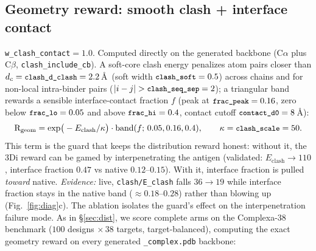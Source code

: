 \documentclass[11pt]{article}
\newcommand{\R}{\mathrm{R}}
\newcommand{\eclash}{E_{\mathrm{clash}}}
\newcommand{\ttk}[1]{\texttt{\small #1}}
\begin{document}
\subsection{Geometry reward: smooth clash + interface contact}
\ttk{w\_clash\_contact}$=1.0$. Computed directly on the generated backbone (C$\alpha$ plus
C$\beta$, \ttk{clash\_include\_cb}). A soft-core clash energy penalizes atom pairs closer than
$d_c=\ttk{clash\_d\_clash}=2.2$\,\AA\ (soft width $\ttk{clash\_soft}=0.5$) across chains and for
non-local intra-binder pairs ($|i-j|>\ttk{clash\_seq\_sep}=2$); a triangular band rewards a
sensible interface-contact fraction $f$ (peak at $\ttk{frac\_peak}=0.16$, zero below
$\ttk{frac\_lo}=0.05$ and above $\ttk{frac\_hi}=0.4$, contact cutoff $\ttk{contact\_d0}=8$\,\AA):
\[
\R_{\mathrm{geom}}=\exp\!\big(-\eclash/\kappa\big)\cdot\mathrm{band}(f;\,0.05,0.16,0.4),
\qquad \kappa=\ttk{clash\_scale}=50 .
\]
This term is the guard that keeps the distribution reward honest: without it, the 3Di reward can
be gamed by interpenetrating the antigen (validated: $\eclash\!\to\!110$, interface fraction
$0.47$ vs native $0.12$--$0.15$). With it, interface fraction is pulled \emph{toward} native.
\emph{Evidence:} live, \ttk{clash/E\_clash} falls $36\!\to\!19$ while interface fraction stays
in the native band ($\approx\!0.18\text{--}0.28$) rather than blowing up (Fig.~\ref{fig:diag}c).
The ablation isolates the guard's effect on the interpenetration failure mode. As in \S\ref{sec:dist},
we score complete arms on the Complexa-38 benchmark ($100$ designs $\times\,38$ targets, target-balanced),
computing the exact geometry reward on every generated \ttk{\_complex.pdb} backbone:
\end{document}
